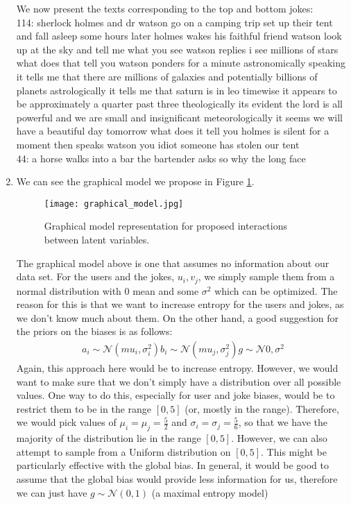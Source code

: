 \documentclass{harvardml}
\theoremstyle{plain}
\begin{document}
\begin{enumerate}[label=(\alph*)]
We now present the texts corresponding to the top and bottom jokes:\\
114:
sherlock holmes and dr watson go on a camping trip set up their tent and fall asleep some hours later holmes wakes his faithful friend watson look up at the sky and tell me what you see watson replies i see millions of stars  what does that tell you watson ponders for a minute astronomically speaking it tells me that there are millions of galaxies and potentially billions of planets astrologically it tells me that saturn is in leo timewise it appears to be approximately a quarter past three theologically its evident the lord is all powerful and we are small and insignificant meteorologically it seems we will have a beautiful day tomorrow what does it tell you holmes is silent for a moment then speaks watson you idiot someone has stolen our tent\\

44:
a horse walks into a bar the bartender asks  so why the long face

 \item
 We can see the graphical model we propose in Figure \ref{fig:graphical_model}.

 \begin{figure}[h!]
\centering
\texttt{[image: graphical\_model.jpg]}
\caption{Graphical model representation for proposed interactions between latent variables.}
\label{fig:graphical_model}
 \end{figure}
The graphical model above is one that assumes no information about our data set. For the users and the jokes, $u_i, v_j$, we simply sample them from a normal distribution with $0$ mean and some $\sigma^2$ which can be optimized. The reason for this is that we want to increase entropy for the users and jokes, as we don't know much about them. On the other hand, a good suggestion for the priors on the biases is as follows:
\begin{align*}
a_i \sim \mathcal{N}(mu_i, \sigma_i^2)
b_i \sim \mathcal{N}(mu_j, \sigma_j^2)
g \sim \mathcal{N}{0, \sigma^2}
\end{align*}
Again, this approach here would be to increase entropy. However, we would want to make sure that we don't simply have a distribution over all possible values. One way to do this, especially for user and joke biases, would be to restrict them to be in the range $[0,5]$ (or, mostly in the range). Therefore, we would pick values of $\mu_i = \mu_j = \frac{5}{2}$ and $\sigma_i = \sigma_j  = \frac{5}{6}$, so that we have the majority of the distribution lie in the range $[0,5]$. However, we can also attempt to sample from a Uniform distribution on $[0,5]$. This might be particularly effective with the global bias. In general, it would be good to assume that the global bias would provide less information for us, therefore we can just have $g \sim \mathcal{N}(0,1)$ (a maximal entropy model)
\end{enumerate}
\end{document}
